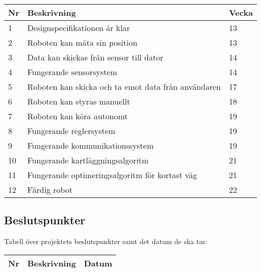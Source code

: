 \documentclass[11pt]{article}
\begin{document}
\begin{flushleft}
\begin{table}[h]
\begin{tabular}{|l|p{.75\linewidth}|l|} \hline

Nr &
Beskrivning &
Vecka \\ \hline

1 &
Designspecifikationen är klar &
13\\ \hline

2 &
Roboten kan mäta sin position &
13 \\ \hline

3 &
Data kan skickas från sensor till dator&
14\\ \hline

4 &
Fungerande sensorsystem &
14 \\ \hline


5 &
Roboten kan skicka och ta emot data från användaren&
17\\ \hline

6 &
Roboten kan styras manuellt &
18\\ \hline

7 &
Roboten kan köra autonomt &
19\\ \hline

8 &
Fungerande reglersystem  &
19 \\ \hline

9 &
Fungerande kommunikationssystem &
19\\ \hline

10 &
Fungerande kartläggningsalgoritm &
21\\ \hline

11 &
Fungerande optimeringsalgoritm för kortast väg &
21\\ \hline

12 &
Färdig robot &
22\\ \hline
 
\end{tabular}
\end{table}

\subsection{Beslutspunkter}
Tabell över projektets beslutspunkter samt det datum de ska tas:

\begin{table}[h]
\begin{tabular}{|l|p{.75\linewidth}|l|} \hline

Nr &
Beskrivning &
Datum \\ \hline


\end{tabular}
\end{table}
\end{flushleft}
\end{document}
